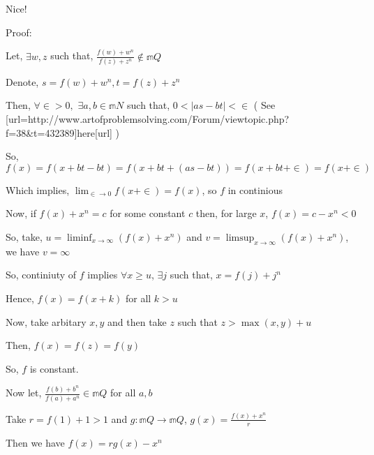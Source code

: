 \begin{solution}
	Nice!

Proof:

Let, $\exists w %
, z$ such that, $\frac{f \left( w \right) + w^n}{f
\left( z \right) + z^n} \not\in \mathbb m{Q}$

Denote, $s = f \left( w \right) + w^n %
, t = f \left( z \right) + z^n$

Then, $\forall \in > 0,$ $\exists a, b \in \mathbb m{N}$ such that, $0 <
\left| a s - b t \right| < \in$ ( See [url=http://www.artofproblemsolving.com/Forum/viewtopic.php?f=38&t=432389]here[\/url] )

So, $f \left( x \right) = f \left( x + b t - b t \right) = f \left( x + b t +
\left( a s - b t \right) \right) = f \left( x + b t + \in \right) = f \left( x
+ \in \right)$

Which implies, $\lim_{\in \longrightarrow 0} f \left( x + \in \right) = f
\left( x \right)$, so $f$ in continious

Now, if $f \left( x \right) + x^n = c$ for some constant $c$
then, for large $x$, $f \left( x \right) = c - x^n < 0$

So, take, $u = \liminf_{x \longrightarrow \infty} \left( f(x)+x^n \right)$ and $v = \limsup_{x \longrightarrow \infty} \left(  f(x)+x^n \right)$,
we have $v = \infty$

So, continiuty of $f$ implies $\forall x \geq u$, $\exists j$ such that, $x =
f \left( j \right) + j^n$

Hence, $f \left( x \right) = f \left( x + k \right)$ for all $k > u$

Now, take arbitary $x %
, y$ and then take $z$ such that $z > \max
\left( x, y \right) + u$

Then, $f \left( x \right) = f \left( z \right) = f \left( y \right)$

So, $f$ is constant.



Now let, $\frac{f \left( b \right) + b^n}{f \left( a \right) + a^n} \in
\mathbb m{Q}$ for all $a, b$

Take $r = f \left( 1 \right) + 1 > 1$ and $g : \mathbb m{Q} \longrightarrow
\mathbb m{Q} %
$, $g \left( x \right) = \frac{f \left( x \right) +
x^n}{r}$

Then we have $f \left( x \right) = r g \left( x \right) - x^n$


\end{solution}
